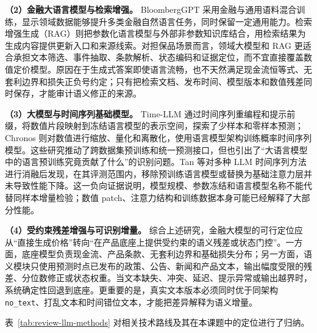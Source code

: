 \textbf{（2）金融大语言模型与检索增强。}
BloombergGPT 采用金融与通用语料混合训练，显示领域数据能够提升多类金融自然语言任务，同时保留一定通用能力\cite{wu_2023_bloomberggpt}。检索增强生成（RAG）则把参数化语言模型与外部非参数知识库结合，用检索结果为生成内容提供更新入口和来源线索\cite{lewis_2020_rag}。对担保品场景而言，领域大模型和 RAG 更适合承担文本筛选、事件抽取、条款解析、状态编码和证据定位，而不宜直接覆盖数值定价模型。原因在于生成式答案即使语言流畅，也不天然满足现金流恒等式、无套利边界和损失正负号约定；只有把检索文档、发布时间、模型版本和数值残差同时保存，才能审计语义修正的来源。

\textbf{（3）大模型与时间序列基础模型。}
Time-LLM 通过时间序列重编程和提示前缀，将数值片段映射到冻结语言模型的表示空间，探索了少样本和零样本预测\cite{jin_2024_timellm}；Chronos 则对数值进行缩放、量化和离散化，使用语言模型架构训练概率时间序列模型\cite{ansari_2024_chronos}。这些研究推动了跨数据集预训练和统一预测接口，但也引出了“大语言模型中的语言预训练究竟贡献了什么”的识别问题。Tan 等对多种 LLM 时间序列方法进行消融后发现，在其评测范围内，移除预训练语言模型或替换为基础注意力层并未导致性能下降\cite{tan_2024_llm_ts}。这一负向证据说明，模型规模、参数冻结和语言模型名称不能代替同样本增量检验；数值 patch、注意力结构和训练数据本身可能已经解释了大部分性能。

\textbf{（4）受约束残差增强与可识别增量。}
综合上述研究，金融大模型的可行定位应从“直接生成价格”转向“在产品底座上提供受约束的语义残差或状态门控”。一方面，底座模型负责现金流、产品条款、无套利边界和基础损失分布；另一方面，语义模块只使用预测时点已发布的政策、公告、新闻和产品文本，输出幅度受限的残差、分位数修正或状态权重。当文本缺失、冲突、延迟、提示异常或输出越界时，系统确定性回退到底座。更重要的是，真实文本版本必须同时优于同架构 \texttt{no\_text}、打乱文本和时间错位文本，才能把差异解释为语义增量。

表~\ref{tab:review-llm-methods} 对相关技术路线及其在本课题中的定位进行了归纳。

